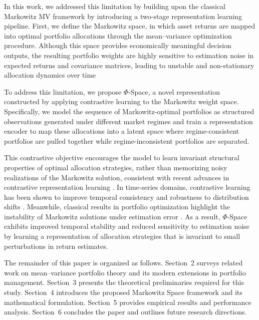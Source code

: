 \documentclass[preprint,12pt]{elsarticle}
\theoremstyle{plain}
\theoremstyle{definition}
\begin{document}
In this work, we addressed this limitation by building upon the classical Markowitz MV framework  by introducing a two-stage representation learning pipeline. First, we define the Markowitz space\cite{golmah2026markowitzspace}, in which asset returns are mapped into optimal portfolio allocations through the mean–variance optimization procedure. Although this space provides economically meaningful decision outputs, the resulting portfolio weights are highly sensitive to estimation noise in expected returns and covariance matrices, leading to unstable and non-stationary allocation dynamics over time 

To address this limitation, we propose $\Phi$-Space, a novel representation constructed by applying contrastive learning to the Markowitz weight space. Specifically, we model the sequence of Markowitz-optimal portfolios as structured observations generated under different market regimes and train a representation encoder to map these allocations into a latent space where regime-consistent portfolios are pulled together while regime-inconsistent portfolios are separated.

This contrastive objective encourages the model to learn invariant structural properties of optimal allocation strategies, rather than memorizing noisy realizations of the Markowitz solution, consistent with recent advances in contrastive representation learning \cite{chen2020simclr,he2020moco,wang2020understanding}. In time-series domains, contrastive learning has been shown to improve temporal consistency and robustness to distribution shifts \cite{oord2018cpc,eldele2021contrastive,yue2022ts2vec}. Meanwhile, classical results in portfolio optimization highlight the instability of Markowitz solutions under estimation error \cite{michaud1989instability,markowitz1952}. As a result, $\Phi$-Space exhibits improved temporal stability and reduced sensitivity to estimation noise by learning a representation of allocation strategies that is invariant to small perturbations in return estimates.

The remainder of this paper is organized as follows. Section~2 surveys related work on mean--variance portfolio theory and its modern extensions in portfolio management. Section~3 presents the theoretical preliminaries required for this study. Section~4 introduces the proposed Markowitz Space framework and its mathematical formulation. Section~5 provides empirical results and performance analysis. Section~6 concludes the paper and outlines future research directions.
\end{document}
